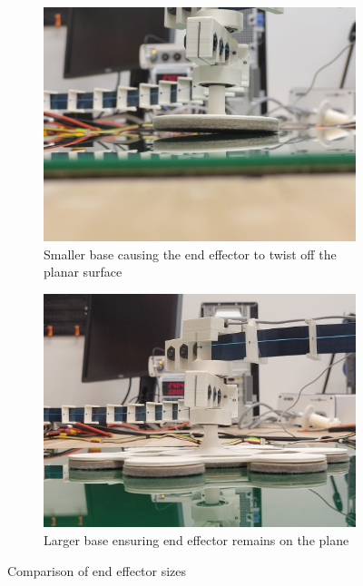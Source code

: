 \begin{figure}[h]
     \centering
     \begin{subfigure}[b]{0.48\textwidth}
         \centering
         \includegraphics[width=\textwidth]{images/small_ee.jpeg}
         \caption{Smaller base causing the end effector to twist off the planar surface}
         \label{fig:small_ee}
     \end{subfigure}
     \hfill
     \begin{subfigure}[b]{0.48\textwidth}
         \centering
         \includegraphics[width=\textwidth]{images/large_ee.jpeg}
         \caption{Larger base ensuring end effector remains on the plane}
         \label{fig:large_ee}
     \end{subfigure}
        \caption{Comparison of end effector sizes}
        \label{fig:ee_comparison}
\end{figure}

